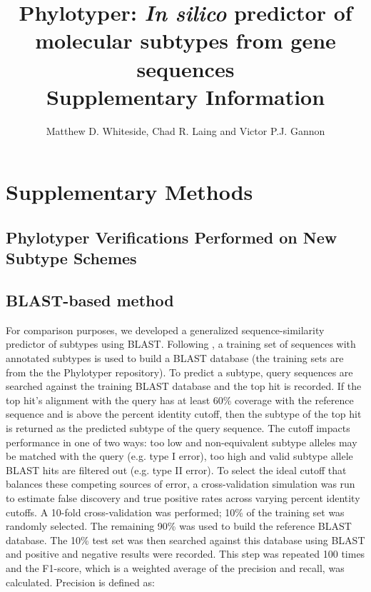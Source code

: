 \documentclass[11pt,letterpaper]{article}
\title{Phylotyper: {\it In silico} predictor of molecular subtypes from gene sequences \\ \large Supplementary Information}
\author{Matthew D. Whiteside, Chad R. Laing and Victor P.J. Gannon}
\date{ }
\begin{document}
 
 
\tableofcontents

\clearpage

\section{Supplementary Methods}


\subsection{Phylotyper Verifications Performed on New Subtype Schemes}




\subsection{BLAST-based method}

For comparison purposes, we developed a generalized sequence-similarity predictor of subtypes using BLAST. Following \citep{Jenkins2015}, a training set of sequences with annotated subtypes is used to build a BLAST database (the training sets are from the the Phylotyper repository). To predict a subtype, query sequences are searched against the training BLAST database and the top hit is recorded. If the top hit's alignment with the query has at least 60\% coverage with the reference sequence and is above the percent identity cutoff, then the subtype of the top hit is returned as the predicted subtype of the query sequence. The cutoff impacts performance in one of two ways: too low and non-equivalent subtype alleles may be matched with the query (e.g. type I error), too high and valid subtype allele BLAST hits are filtered out (e.g. type II error). To select the ideal cutoff that balances these competing sources of error, a cross-validation simulation was run to estimate false discovery and true positive rates across varying percent identity cutoffs. A 10-fold cross-validation was performed; 10\% of the training set was randomly selected. The remaining 90\% was used to build the reference BLAST database. The 10\% test set was then searched against this database using BLAST and positive and negative results were recorded. This step was repeated 100 times and the F1-score, which is a weighted average of the precision and recall, was calculated. Precision is defined as: 
\end{document}
